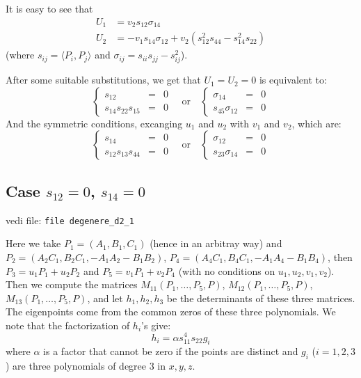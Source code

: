 \documentclass{amsart}
\theoremstyle{plain}
\theoremstyle{definition}
\newcommand{\scl}[2]{\langle #1, #2 \rangle}
\begin{document}
It is easy to see that
\begin{equation}
  \begin{split}
    U_1 & = v_2s_{12}\sigma_{14}\\
    U_2 & = -v_1 s_{14}\sigma_{12} + v_2(s_{12}^2s_{44}-s_{14}^2s_{22})
  \end{split}
\end{equation}
(where $s_{ij} = \scl{P_i}{P_j}$ and $\sigma_{ij} = s_{ii}s_{jj}-s_{ij}^2$). 

After some suitable substitutions, we get that $U_1 = U_2 = 0$ is equivalent
to:
\[
\left\{
\begin{array}{rcl}
  s_{12} & = & 0 \\
  s_{14}s_{22}s_{15} & = & 0
\end{array}
\right.
\quad
\mbox{or}
\quad
\left\{
\begin{array}{rcl}
  \sigma_{14} & = & 0 \\
  s_{45}\sigma_{12} & = & 0
\end{array}
\right.
\]
And the symmetric conditions, excanging $u_1$ and $u_2$ with $v_1$ and $v_2$,
which are:
\[
\left\{
\begin{array}{rcl}
  s_{14} & = & 0 \\
  s_{12}s_{13}s_{44} & = & 0
\end{array}
\right.
\quad \mbox{or}
\quad
\left\{
\begin{array}{rcl}
  \sigma_{12} & = & 0 \\
  s_{23}\sigma_{14} & = & 0
\end{array}
\right.
\]

\subsection{Case $s_{12} = 0$, $s_{14} = 0$}
vedi file: \verb+file degenere_d2_1+

Here we take $P_1 = (A_1, B_1, C_1)$ (hence in an arbitray way)
and $P_2 = (A_2C_1, B_2C_1, -A_1A_2-B_1B_2)$,
$P_4=(A_4C_1, B_4C_1, -A_1A_4-B_1B_4)$, then $P_3 = u_1P_1+u_2P_2$
and $P_5 = v_1 P_1 + v_2 P_4$ (with no conditions on $u_1, u_2, v_1, v_2$).
Then we compute the matrices $M_{11}(P_1, \dots, P_5, P)$,
$M_{12}(P_1, \dots, P_5, P)$, $M_{13}(P_1, \dots, P_5, P)$,
and let $h_1, h_2, h_3$ be the determinants of these three matrices.
The eigenpoints come from the common zeros of these three polynomials.
We note that the factorization of $h_i$'s give:
\[
h_i = \alpha s_{11}^4s_{22} g_i
\]
where $\alpha$ is a factor that cannot be zero if the points are distinct
and $g_i$ ($i=1, 2, 3$) are three polynomials of degree $3$ in $x, y, z$. 
\end{document}
